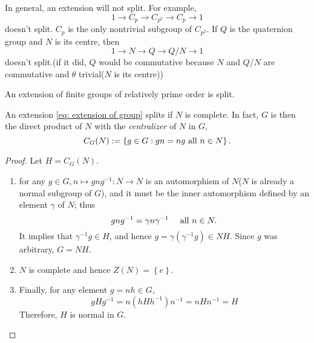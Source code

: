 \begin{example}
  In general, an extension will not split.
  For example,
  \[
    1 \to C_p \to C_{p^2} \to C_p \to 1
  \]
  doesn't split.
    \( C_p \) is the only nontrivial subgroup of \( C_{p^2} \).
  If \( Q \) is the quaternion group and \( N \) is its centre, then
  \[
    1 \to N \to Q \to Q / N \to 1
  \]
  doesn't split.(if it did, \( Q \) would be commutative because \( N \) and \( Q / N \) are commutative and \( \theta \) trivial(\( N \) is its centre))
\end{example}

\begin{theorem}
  An extension of finite groups of relatively prime order is split.
\end{theorem}

\begin{proposition}
  An extension \cref{eq: extension of group} splits if \( N \) is complete.
  In fact, \( G \) is then the direct product of \( N \) with the \emph{centralizer} of \( N \) in \( G \),
  \[
    C_G(N) := \left\lbrace g \in G: gn = ng \textmd{ all } n \in N \right\rbrace.
  \]
\end{proposition}
\begin{proof}
  Let \( H = C_G(N) \).
  \begin{enumerate}
    \item for any \( g \in G, n \mapsto g n g^{-1}: N \to N \) is an automorphism of \( N \)(\( N \) is already a normal subgroup of \( G \)), and it must be the inner automorphism defined by an element \( \gamma \) of \( N \);
      thus
      \[
        g n g^{-1} = \gamma n \gamma^{-1}\quad \textmd{ all } n \in N.
      \]
      It implies that \( \gamma^{-1}g \in H \), and hence \( g = \gamma(\gamma^{-1}g) \in N H \).
      Since \( g \) was arbitrary, \( G = NH \).
    \item \( N \) is complete and hence \( Z(N) = \left\lbrace e \right\rbrace \).
    \item Finally, for any element \( g = nh \in G \),
      \[
        g H g^{-1} = n(h H h^{-1})n^{-1} = nH n^{-1} = H
      \]
      Therefore, \( H \) is normal in \( G \).
  \end{enumerate}
\end{proof}
